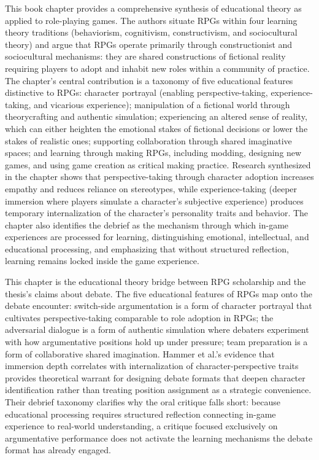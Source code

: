 \documentclass[11pt, a4paper]{article}
\begin{document}
This book chapter provides a comprehensive synthesis of educational theory
as applied to role-playing games.
The authors situate RPGs within four learning theory traditions (behaviorism,
cognitivism, constructivism, and sociocultural theory) and argue that RPGs
operate primarily through constructionist and sociocultural mechanisms: they
are shared constructions of fictional reality requiring players to adopt and
inhabit new roles within a community of practice. The chapter's central
contribution is a taxonomy of five educational features distinctive to RPGs:
character portrayal (enabling perspective-taking, experience-taking, and
vicarious experience); manipulation of a fictional world through theorycrafting
and authentic simulation; experiencing an altered sense of reality, which can
either heighten the emotional stakes of fictional decisions or lower the stakes
of realistic ones; supporting collaboration through shared imaginative spaces;
and learning through making RPGs, including modding, designing new games, and
using game creation as critical making practice. Research synthesized in the
chapter shows that perspective-taking through character adoption increases
empathy and reduces reliance on stereotypes, while experience-taking (deeper
immersion where players simulate a character's subjective experience) produces
temporary internalization of the character's personality traits and behavior.
The chapter also identifies the debrief as the mechanism through which
in-game experiences are processed for learning, distinguishing emotional,
intellectual, and educational processing, and emphasizing that without
structured reflection, learning remains locked inside the game experience.

This chapter is the educational theory bridge between RPG scholarship and the
thesis's claims about debate. The five educational features of RPGs map onto
the debate encounter: switch-side argumentation is a form of character
portrayal that cultivates perspective-taking comparable to role adoption in
RPGs; the adversarial dialogue is a form of authentic simulation where
debaters experiment with how argumentative positions hold up under pressure;
team preparation is a form of collaborative shared imagination. Hammer et al.'s
evidence that immersion depth correlates with internalization of
character-perspective traits provides theoretical warrant for designing debate
formats that deepen character identification rather than treating position
assignment as a strategic convenience. Their debrief taxonomy clarifies why
the oral critique falls short: because educational processing requires
structured reflection connecting in-game experience to real-world
understanding, a critique focused exclusively on argumentative performance
does not activate the learning mechanisms the debate format has already
engaged.
\end{document}
